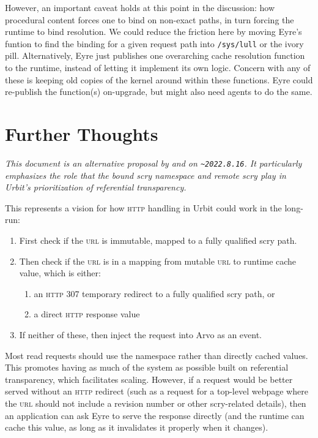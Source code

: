 \documentclass[twoside]{article}
\begin{document}
However, an important caveat holds at this point in the discussion:  how procedural content forces one to bind on non-exact paths, in turn forcing the runtime to bind resolution.  We could reduce the friction here by moving Eyre's funtion to find the binding for a given request path into \texttt{/sys/lull} or the ivory pill.  Alternatively, Eyre just publishes one overarching cache resolution function to the runtime, instead of letting it implement its own logic.  Concern with any of these is keeping old copies of the kernel around within these functions. Eyre could re-publish the function(s) on-upgrade, but might also need agents to do the same.

\section{Further Thoughts}

\noindent\sloppy
\emph{This document is an alternative proposal by  and  on \texttt{\textasciitilde 2022.8.16}.  It particularly emphasizes the role that the bound scry namespace and remote scry play in Urbit's prioritization of referential transparency.}

This represents a vision for how \textsc{http} handling in Urbit could work in the long-run:

\begin{enumerate}
  \item  First check if the \textsc{url} is immutable, mapped to a fully qualified scry path.
  \item  Then check if the \textsc{url} is in a mapping from mutable \textsc{url} to runtime cache value, which is either:
  \begin{enumerate}
    \item  an \textsc{http} 307 temporary redirect to a fully qualified scry path, or
    \item  a direct \textsc{http} response value
  \end{enumerate}
  \item  If neither of these, then inject the request into Arvo as an event.
\end{enumerate}

Most read requests should use the namespace rather than directly cached values.  This promotes having as much of the system as possible built on referential transparency, which facilitates scaling.  However, if a request would be better served without an \textsc{http} redirect (such as a request for a top-level webpage where the \textsc{url} should not include a revision number or other scry-related details), then an application can ask Eyre to serve the response directly (and the runtime can cache this value, as long as it invalidates it properly when it changes).
\end{document}
